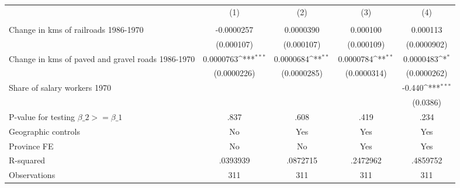 {
\def\sym#1{\ifmmode^{#1}\else\(^{#1}\)\fi}
\begin{tabular}{l*{4}{c}}
\hline\hline
                &\multicolumn{1}{c}{(1)}&\multicolumn{1}{c}{(2)}&\multicolumn{1}{c}{(3)}&\multicolumn{1}{c}{(4)}\\
                &\multicolumn{1}{c}{}&\multicolumn{1}{c}{}&\multicolumn{1}{c}{}&\multicolumn{1}{c}{}\\
\hline
Change in kms of railroads 1986-1970&-0.0000257         &0.0000390         & 0.000100         & 0.000113         \\
                &(0.000107)         &(0.000107)         &(0.000109)         &(0.0000902)         \\
[1em]
Change in kms of paved and gravel roads 1986-1970&0.0000763\sym{***}&0.0000684\sym{**} &0.0000784\sym{**} &0.0000483\sym{*}  \\
                &(0.0000226)         &(0.0000285)         &(0.0000314)         &(0.0000262)         \\
[1em]
Share of salary workers 1970&                  &                  &                  &   -0.440\sym{***}\\
                &                  &                  &                  & (0.0386)         \\
\hline
P-value for testing $\beta\_{2} >= \beta\_{1}$&     .837         &     .608         &     .419         &     .234         \\
Geographic controls&       No         &      Yes         &      Yes         &      Yes         \\
Province FE     &       No         &       No         &      Yes         &      Yes         \\
R-squared       & .0393939         & .0872715         & .2472962         & .4859752         \\
Observations    &      311         &      311         &      311         &      311         \\
\hline\hline
\end{tabular}
}

